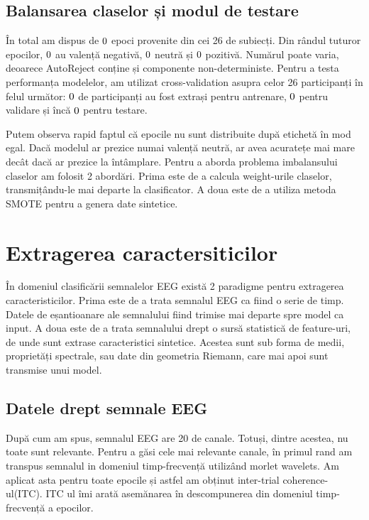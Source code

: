 \subsection{Balansarea claselor și modul de testare}

În total am dispus de $0$ epoci provenite din cei 26 de subiecți. Din rândul tuturor epocilor, $0$ au valență negativă, $0$ neutră și $0$ pozitivă. Numărul poate varia, deoarece AutoReject conține și componente non-deterministe. Pentru a testa performanța modelelor, am utilizat cross-validation asupra celor 26 participanți în felul următor: $0$ de participanți au fost extrași pentru antrenare, $0$ pentru validare și încă $0$ pentru testare.

Putem observa rapid faptul că epocile nu sunt distribuite după etichetă în mod egal. Dacă modelul ar prezice numai valență neutră, ar avea acuratețe mai mare decât dacă ar prezice la întâmplare. Pentru a aborda problema imbalansului claselor am folosit 2 abordări. Prima este de a calcula weight-urile claselor, transmițându-le mai departe la clasificator. A doua este de a utiliza metoda SMOTE\cite{imblearn} pentru a genera date sintetice.

\section{Extragerea caractersiticilor}
În domeniul clasificării semnalelor EEG există 2 paradigme pentru extragerea caracteristicilor. Prima este de a trata semnalul EEG ca fiind o serie de timp. Datele de eșantioanare ale semnalului fiind trimise mai departe spre model ca input. A doua este de a trata semnalului drept o sursă statistică de feature-uri, de unde sunt extrase caracteristici sintetice. Acestea sunt sub forma de medii, proprietăți spectrale, sau date din geometria Riemann, care mai apoi sunt transmise unui model.

\subsection{Datele drept semnale EEG}
După cum am spus, semnalul EEG are 20 de canale. Totuși, dintre acestea, nu toate sunt relevante. Pentru a găsi cele mai relevante canale, în primul rand am transpus semnalul in domeniul timp-frecvență utilizând morlet wavelets. Am aplicat asta pentru toate epocile și astfel am obținut inter-trial coherence-ul(ITC). ITC ul îmi arată asemănarea în descompunerea din domeniul timp-frecvență a epocilor.

